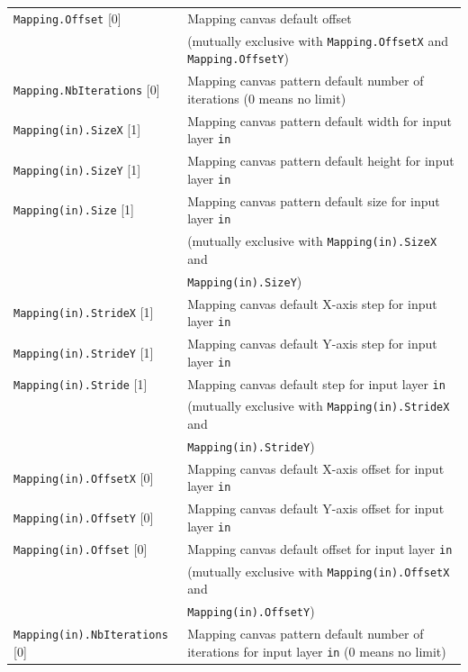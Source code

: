 \documentclass[a4paper,11pt,oneside]{article}
\begin{document}
\begin{center}
\begin{longtable}{| p{5cm} | p{10cm} | }
  \lstinline!Mapping.Offset! [0] & Mapping canvas default offset \\
   & (mutually exclusive with \lstinline!Mapping.OffsetX!
   and \lstinline!Mapping.OffsetY!) \\
  \lstinline!Mapping.NbIterations! [0] & Mapping canvas pattern default number
   of iterations (0 means no limit) \\
  \lstinline!Mapping(in).SizeX! [1] & Mapping canvas pattern default width
  for input layer \lstinline!in! \\
  \lstinline!Mapping(in).SizeY! [1] & Mapping canvas pattern default height
   for input layer \lstinline!in! \\
  \lstinline!Mapping(in).Size! [1] & Mapping canvas pattern default size
  for input layer \lstinline!in! \\
   & (mutually exclusive with \lstinline!Mapping(in).SizeX! and \\
   & \lstinline!Mapping(in).SizeY!) \\
  \lstinline!Mapping(in).StrideX! [1] & Mapping canvas default X-axis step
   for input layer \lstinline!in! \\
  \lstinline!Mapping(in).StrideY! [1] & Mapping canvas default Y-axis step
  for input layer \lstinline!in! \\
  \lstinline!Mapping(in).Stride! [1] & Mapping canvas default step
  for input layer \lstinline!in! \\
   & (mutually exclusive with \lstinline!Mapping(in).StrideX! and \\
   & \lstinline!Mapping(in).StrideY!) \\
  \lstinline!Mapping(in).OffsetX! [0] & Mapping canvas default X-axis offset
  for input layer \lstinline!in! \\
  \lstinline!Mapping(in).OffsetY! [0] & Mapping canvas default Y-axis offset
  for input layer \lstinline!in! \\
  \lstinline!Mapping(in).Offset! [0] & Mapping canvas default offset for input
   layer \lstinline!in! \\
   & (mutually exclusive with \lstinline!Mapping(in).OffsetX! and \\
   & \lstinline!Mapping(in).OffsetY!) \\
  \lstinline!Mapping(in).NbIterations! [0] & Mapping canvas pattern default
  number of iterations for input layer \lstinline!in! (0 means no limit) \\
 \hline
\end{longtable}
\end{center}
\end{document}
